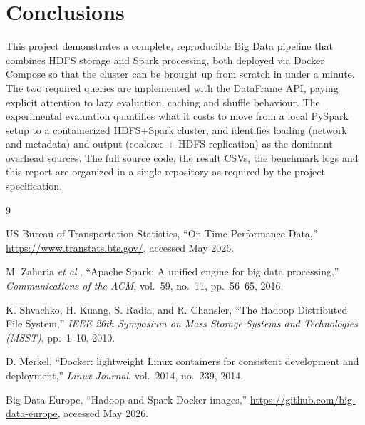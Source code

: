 \documentclass[conference]{IEEEtran}
\begin{document}
\section{Conclusions}\label{sec:conclusion}

This project demonstrates a complete, reproducible Big Data
pipeline that combines HDFS storage and Spark processing, both
deployed via Docker Compose so that the cluster can be brought
up from scratch in under a minute. The two required queries are
implemented with the DataFrame API, paying explicit attention to
lazy evaluation, caching and shuffle behaviour. The experimental
evaluation quantifies what it costs to move from a local PySpark
setup to a containerized HDFS+Spark cluster, and identifies
loading (network and metadata) and output (coalesce + HDFS
replication) as the dominant overhead sources. The full source
code, the result CSVs, the benchmark logs and this report are
organized in a single repository as required by the project
specification.

\begin{thebibliography}{9}

US Bureau of Transportation Statistics, ``On-Time Performance
Data,'' \url{https://www.transtats.bts.gov/}, accessed May 2026.

M. Zaharia \emph{et al.}, ``Apache Spark: A unified engine for
big data processing,'' \emph{Communications of the ACM},
vol.~59, no.~11, pp.~56--65, 2016.

K. Shvachko, H. Kuang, S. Radia, and R. Chansler, ``The Hadoop
Distributed File System,'' \emph{IEEE 26th Symposium on Mass
Storage Systems and Technologies (MSST)}, pp.~1--10, 2010.

D. Merkel, ``Docker: lightweight Linux containers for consistent
development and deployment,'' \emph{Linux Journal}, vol.~2014,
no.~239, 2014.

Big Data Europe, ``Hadoop and Spark Docker images,''
\url{https://github.com/big-data-europe}, accessed May 2026.

\end{thebibliography}
\end{document}

